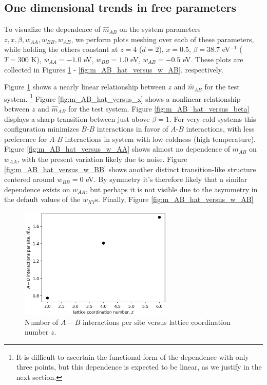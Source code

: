 \documentclass[10pt]{article}
\begin{document}
\subsection{One dimensional trends in free parameters}
To visualize the dependence of $\hat{m}_{AB}$ on the system parameters $z,x,\beta,w_{AA},w_{BB},w_{AB}$, we perform plots meshing over each of these parameters, while holding the others constant at $z=4$ ($d = 2$), $x = 0.5$, $\beta = 38.7$ eV$^{-1}$ ($T = 300$ K), $w_{AA} = -1.0$ eV, $w_{BB} = 1.0$ eV, $w_{AB} = -0.5$ eV.
These plots are collected in Figures \ref{fig:m_AB_hat_versus_z} - \ref{fig:m_AB_hat_versus_w_AB}, respectively.

Figure \ref{fig:m_AB_hat_versus_z} shows a nearly linear relationship between $z$ and $\hat{m}_{AB}$ for the test system. \footnote{It is difficult to ascertain the functional form of the dependence with only three points, but this dependence is expected to be linear, as we justify in the next section.} 
Figure \ref{fig:m_AB_hat_versus_x} shows a nonlinear relationship between $z$ and $\hat{m}_{AB}$ for the test system.
Figure \ref{fig:m_AB_hat_versus_beta} displays a sharp transition between just above $\beta = 1$. For very cold systems this configuration minimizes $B$-$B$ interactions in favor of $A$-$B$ interactions, with less preference for $A$-$B$ interactions in system with low coldness (high temperature).
Figure \ref{fig:m_AB_hat_versus_w_AA} shows almost no dependence of $m_{AB}$ on $w_{AA}$, with the present variation likely due to noise.
Figure \ref{fig:m_AB_hat_versus_w_BB} shows another distinct transition-like structure centered around $w_{BB}=0$ eV.
By symmetry it's therefore likely that a similar dependence exists on $w_{AA}$, but perhaps it is not visible due to the asymmetry in the default values of the $w_{XY}$s.
Finally, Figure \ref{fig:m_AB_hat_versus_w_AB}

\begin{figure}[h!]
\centering
\includegraphics[width=0.65\textwidth]{Figures/m_AB_hat_versus_z.png}
\caption{Number of $A-B$ interactions per site versus lattice coordination number $z$.}
\label{fig:m_AB_hat_versus_z}
\end{figure}
\end{document}
